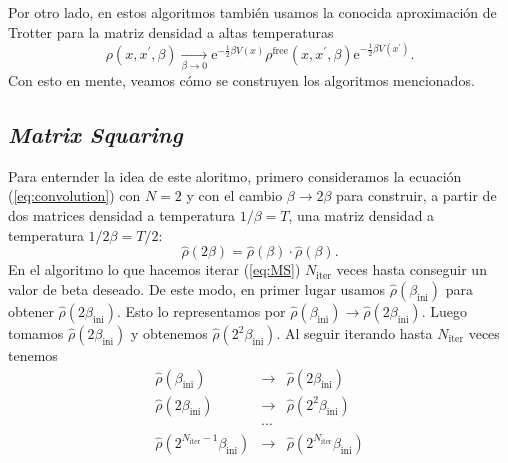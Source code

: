 \documentclass[%
 reprint,
 amsmath,amssymb,
 aps,
 pra,
]{revtex4-2}
\begin{document}
Por otro lado, en estos algoritmos también usamos la conocida aproximación de Trotter para la matriz densidad a altas temperaturas \cite{WernerKrauth2006}
\begin{equation}
	\rho\left(x, x^{\prime}, \beta\right) \underset{\beta \rightarrow 0}{\longrightarrow} \mathrm{e}^{-\frac{1}{2} \beta V(x)} \rho^{\mathrm{free}}\left(x, x^{\prime}, \beta\right) \mathrm{e}^{-\frac{1}{2} \beta V\left(x^{\prime}\right)}. \label{eq:trotter}
\end{equation}	
Con esto en mente, veamos cómo se construyen los algoritmos mencionados. 

\subsection{\textit{Matrix Squaring}\label{subsec:MtxSq}}
Para enternder la idea de este aloritmo, primero consideramos la ecuación (\ref{eq:convolution}) con $ N = 2 $ y con el cambio $\beta\rightarrow2\beta$  para construir, a partir de dos matrices densidad a temperatura $ 
1 / \beta = T$, una matriz densidad a temperatura $ 1 /2 \beta = T/2 $:
\begin{equation}
\hat{\rho}(2\beta) = \hat{\rho}(\beta) \cdot \hat{\rho}(\beta). \label{eq:MS}
\end{equation}
En el algoritmo lo que hacemos iterar (\ref{eq:MS}) $N_{\mathrm{iter}}$ veces hasta conseguir un valor de beta deseado. De este modo, en primer lugar usamos $\hat{\rho}(\beta_{\mathrm{ini}})$ para obtener $\hat{\rho}(2\beta_{\mathrm{ini}})$. Esto lo representamos por $\hat{\rho}(\beta_{\mathrm{ini}}) \rightarrow \hat{\rho}(2\beta_{\mathrm{ini}})$. Luego tomamos $\hat{\rho}(2\beta_{\mathrm{ini}})$ y obtenemos $\hat{\rho}(2^2\beta_{\mathrm{ini}})$. Al seguir iterando hasta $N_{\mathrm{iter}}$ veces tenemos
\begin{eqnarray}
	\hat{\rho}(\beta_{\mathrm{ini}}) &\rightarrow& \hat{\rho}(2\beta_{\mathrm{ini}}) \nonumber \\
	\hat{\rho}(2\beta_{\mathrm{ini}}) &\rightarrow& \hat{\rho}(2^2\beta_{\mathrm{ini}}) \nonumber \\
	&\cdots& \nonumber \\
	\hat{\rho}(2^{N_{\mathrm{iter}}-1}\beta_{\mathrm{ini}}) &\rightarrow& \hat{\rho}(2^{N_{\mathrm{iter}}}\beta_{\mathrm{ini}}) \label{eq:MS-iteration-process}
\end{eqnarray}
\end{document}
